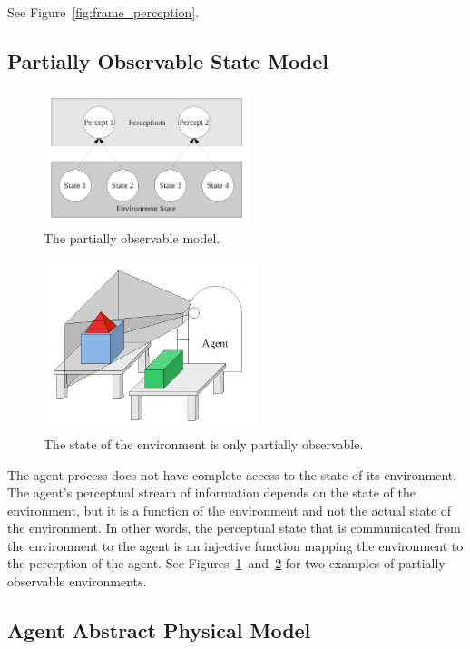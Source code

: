 See Figure~\ref{fig:frame_perception}.


\subsection{Partially Observable State Model}

\begin{figure}[bth]
  \center
  \includegraphics[width=6cm]{gfx/partially_observable}
  \caption[The partially observable state model]{The partially observable model.}
  \label{fig:partially_observable}
\end{figure}

\begin{figure}[bth]
  \center
  \includegraphics[height=5cm]{gfx/partial_frame_perception}
  \caption[The state of the environment is only partially
    observable]{The state of the environment is only partially
    observable.}
  \label{fig:partial_frame_perception}
\end{figure}

The agent process does not have complete access to the state of its
environment.  The agent's perceptual stream of information depends on
the state of the environment, but it is a function of the environment
and not the actual state of the environment.  In other words, the
perceptual state that is communicated from the environment to the
agent is an injective function mapping the environment to the
perception of the agent.  See
Figures~\ref{fig:partially_observable}~and~\ref{fig:partial_frame_perception}
for two examples of partially observable environments.


\subsection{Agent Abstract Physical Model}

